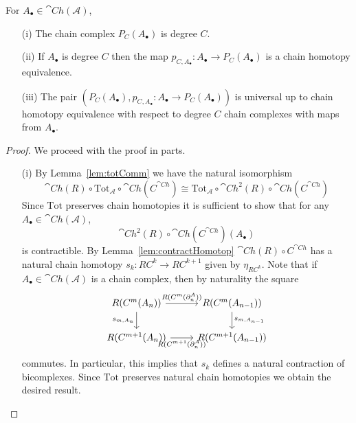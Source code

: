 \begin{prop}[label=prop:4.5C]
    For $A_\bullet \in \cat{Ch}(\mathcal{A})$,
    \begin{itemize}
        \item[(i)] The chain complex $P_C(A_\bullet)$ is degree $C$.
        \item[(ii)] If $A_\bullet$ is degree $C$ then the map $p_{C,A_\bullet}:A_\bullet\to P_C(A_\bullet)$ is a chain homotopy equivalence.
        \item[(iii)] The pair $(P_C(A_\bullet),p_{C,A_\bullet}:A_\bullet\to P_C(A_\bullet))$ is universal up to chain homotopy equivalence with respect to degree $C$ chain complexes with maps from $A_\bullet$. 
    \end{itemize}
\end{prop}
\begin{proof}
    We proceed with the proof in parts.
    \begin{itemize}
        \item[(i)] By Lemma~\ref{lem:totComm} we have the natural isomorphism
            \begin{equation*}
                \cat{Ch}(R)\circ \text{Tot}_\mathcal{A}\circ \cat{Ch}(C^{\cat{Ch}}) \cong \text{Tot}_\mathcal{A}\circ \cat{Ch}^2(R)\circ \cat{Ch}(C^{\cat{Ch}})
            \end{equation*}
        Since $\text{Tot}$ preserves chain homotopies it is sufficient to show that for any $A_\bullet \in \cat{Ch}(\mathcal{A})$,
        \begin{equation*}
            \cat{Ch}^2(R)\circ \cat{Ch}(C^{\cat{Ch}})(A_\bullet)
        \end{equation*}
        is contractible. By Lemma~\ref{lem:contractHomotop} $\cat{Ch}(R)\circ C^{\cat{Ch}}$ has a natural chain homotopy $s_k:RC^k\to RC^{k+1}$ given by $\eta_{RC^k}$. Note that if $A_\bullet \in \cat{Ch}(\mathcal{A})$ is a chain complex, then by naturality the square 
        \[\begin{tikzcd}
            {R(C^m(A_n))} & {R(C^m(A_{n-1}))} \\
            {R(C^{m+1}(A_n))} & {R(C^{m+1}(A_{n-1}))}
            \arrow["{R(C^m(\partial^A_n))}", from=1-1, to=1-2]
            \arrow["{s_{m,A_n}}"', from=1-1, to=2-1]
            \arrow["{R(C^{m+1}(\partial_n^A))}"', from=2-1, to=2-2]
            \arrow["{s_{m,A_{n-1}}}", from=1-2, to=2-2]
        \end{tikzcd}\]
        commutes. In particular, this implies that $s_k$ defines a natural contraction of bicomplexes. Since $\text{Tot}$ preserves natural chain homotopies we obtain the desired result.

\end{itemize}
\end{proof}
